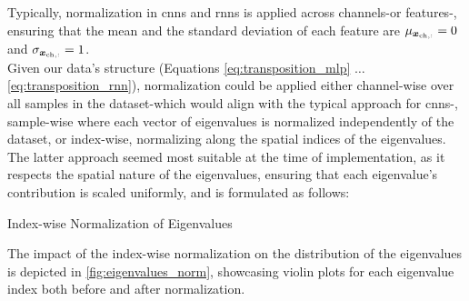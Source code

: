 Typically, normalization in \glspl{cnn} and \glspl{rnn} is applied across channels-or features-, ensuring that the mean and
the standard deviation of each feature are \( \mu_{\boldsymbol{x}_{\mathrm{ch},:}} = 0 \) and \( \sigma_{\boldsymbol{x}_{\mathrm{ch},:}} = 1 \).\\
Given our data's structure (Equations \ref{eq:transposition_mlp} \( \ldots \) \ref{eq:transposition_rnn}), normalization could be applied
either channel-wise over all samples in the dataset-which would align with the typical approach for \glspl{cnn}-, sample-wise
where each vector of eigenvalues is normalized independently of the dataset, or index-wise, normalizing along the spatial
indices of the eigenvalues.\\
The latter approach seemed most suitable at the time of implementation, as it respects the spatial nature of the eigenvalues,
ensuring that each eigenvalue's contribution is scaled uniformly, and is formulated as follows:

\begin{algorithm}[H]
    \caption{Index-wise Normalization of Eigenvalues}
    \label{alg:index_wise_normalization}
    \DontPrintSemicolon

\end{algorithm}

The impact of the index-wise normalization on the distribution of the eigenvalues is depicted in \autoref{fig:eigenvalues_norm},
showcasing violin plots for each eigenvalue index both before and after normalization.

